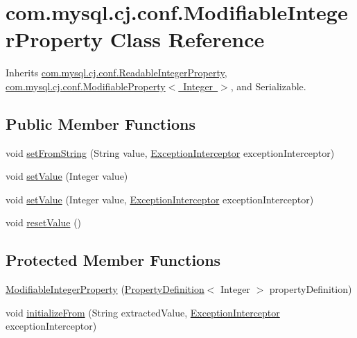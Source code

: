 \hypertarget{classcom_1_1mysql_1_1cj_1_1conf_1_1_modifiable_integer_property}{}\section{com.\+mysql.\+cj.\+conf.\+Modifiable\+Integer\+Property Class Reference}
\label{classcom_1_1mysql_1_1cj_1_1conf_1_1_modifiable_integer_property}


Inherits \mbox{\hyperlink{classcom_1_1mysql_1_1cj_1_1conf_1_1_readable_integer_property}{com.\+mysql.\+cj.\+conf.\+Readable\+Integer\+Property}}, \mbox{\hyperlink{interfacecom_1_1mysql_1_1cj_1_1conf_1_1_modifiable_property}{com.\+mysql.\+cj.\+conf.\+Modifiable\+Property$<$ Integer $>$}}, and Serializable.

\subsection*{Public Member Functions}
\begin{DoxyCompactItemize}
\item 
void \mbox{\hyperlink{classcom_1_1mysql_1_1cj_1_1conf_1_1_modifiable_integer_property_abb2ce326bfd6294cd99992b21477a40d}{set\+From\+String}} (String value, \mbox{\hyperlink{interfacecom_1_1mysql_1_1cj_1_1exceptions_1_1_exception_interceptor}{Exception\+Interceptor}} exception\+Interceptor)
\item 
void \mbox{\hyperlink{classcom_1_1mysql_1_1cj_1_1conf_1_1_modifiable_integer_property_adec8722a38cd0ef777d800e69534f4ba}{set\+Value}} (Integer value)
\item 
void \mbox{\hyperlink{classcom_1_1mysql_1_1cj_1_1conf_1_1_modifiable_integer_property_a894cea497861193a8aae97e09e43f2a0}{set\+Value}} (Integer value, \mbox{\hyperlink{interfacecom_1_1mysql_1_1cj_1_1exceptions_1_1_exception_interceptor}{Exception\+Interceptor}} exception\+Interceptor)
\item 
void \mbox{\hyperlink{classcom_1_1mysql_1_1cj_1_1conf_1_1_modifiable_integer_property_a7c5a274b1082ddd9d854a359bbabae6c}{reset\+Value}} ()
\end{DoxyCompactItemize}
\subsection*{Protected Member Functions}
\begin{DoxyCompactItemize}
\item 
\mbox{\hyperlink{classcom_1_1mysql_1_1cj_1_1conf_1_1_modifiable_integer_property_a1ea2683fa5bcf5648e5d17b9be07b5c9}{Modifiable\+Integer\+Property}} (\mbox{\hyperlink{interfacecom_1_1mysql_1_1cj_1_1conf_1_1_property_definition}{Property\+Definition}}$<$ Integer $>$ property\+Definition)
\item 
void \mbox{\hyperlink{classcom_1_1mysql_1_1cj_1_1conf_1_1_modifiable_integer_property_a8114f79a3efc1afba11f5637bb3d7b85}{initialize\+From}} (String extracted\+Value, \mbox{\hyperlink{interfacecom_1_1mysql_1_1cj_1_1exceptions_1_1_exception_interceptor}{Exception\+Interceptor}} exception\+Interceptor)
\end{DoxyCompactItemize}


